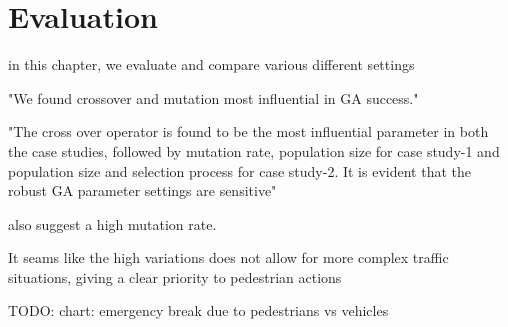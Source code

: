 \chapter{Evaluation}
\label{chap:evaluation}
in this chapter, we evaluate and compare various different settings

"We found crossover and mutation most influential in GA success."\cite{mills_determining_2015}

"The cross over operator is found to be the most influential parameter in both the case studies, followed by mutation rate, population size for case study-1 and population size and selection process for case study-2. It is evident that the robust GA parameter settings are sensitive"\cite{majumdar_genetic_2015}

\cite{boyabatli_parameter_2004} also suggest a high mutation rate.



It seams like the high variations does not allow for more complex traffic situations, giving a clear priority to pedestrian actions

TODO: chart: emergency break due to pedestrians vs vehicles









